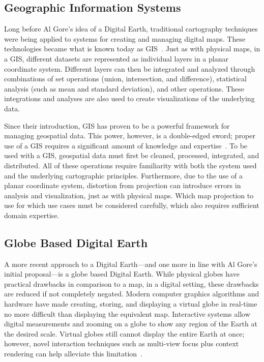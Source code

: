 \subsection{Geographic Information Systems} \label{chap:2:GIS}
Long before Al Gore's idea of a Digital Earth, traditional cartography techniques were being applied to systems for creating and managing digital maps.
These technologies became what is known today as GIS~\cite{foresman1998history}.
Just as with physical maps, in a GIS, different datasets are represented as individual layers in a planar coordinate system.
Different layers can then be integrated and analyzed through combinations of set operations (union, intersection, and difference), statistical analysis (such as mean and standard deviation), and other operations.
These integrations and analyses are also used to create visualizations of the underlying data.


Since their introduction, GIS has proven to be a powerful framework for managing geospatial data.
This power, however, is a double-edged sword; proper use of a GIS requires a significant amount of knowledge and expertise~\cite{antenucci1991geographic}.
To be used with a GIS, geospatial data must first be cleaned, processed, integrated, and distributed.
All of these operations require familiarity with both the system used and the underlying cartographic principles.
Furthermore, due to the use of a planar coordinate system, distortion from projection can introduce errors in analysis and visualization, just as with physical maps.
Which map projection to use for which use cases must be considered carefully, which also requires sufficient domain expertise.


\subsection{Globe Based Digital Earth} \label{chap:2:globeDE}
A more recent approach to a Digital Earth---and one more in line with Al Gore's initial proposal---is a globe based Digital Earth.
While physical globes have practical drawbacks in comparison to a map, in a digital setting, these drawbacks are reduced if not completely negated. 
Modern computer graphics algorithms and hardware have made creating, storing, and displaying a virtual globe in real-time no more difficult than displaying the equivalent map.
Interactive systems allow digital measurements and zooming on a globe to show any region of the Earth at the desired scale.
Virtual globes still cannot display the entire Earth at once; however, novel interaction techniques such as multi-view focus plus context rendering can help alleviate this limitation~\cite{sherlock2017visualizations}.


